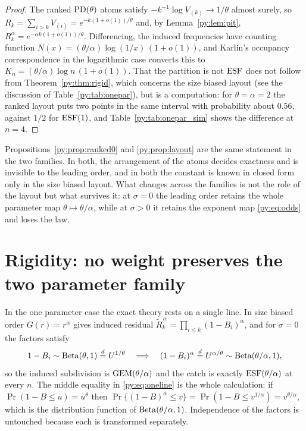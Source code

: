 \begin{proof}
The ranked $\mathrm{PD}(\theta)$ atoms satisfy $-k^{-1}\log V_{(k)} \to 1/\theta$ almost surely, so
$R_k = \sum_{i>k}V_{(i)} = e^{-k(1+o(1))/\theta}$ and, by Lemma~\ref{py:lem:pit},
$R_k^{\alpha} = e^{-\alpha k(1+o(1))/\theta}$. Differencing, the induced frequencies have counting
function $N(x) = (\theta/\alpha)\log(1/x)\,(1+o(1))$, and Karlin's occupancy correspondence in the
logarithmic case converts this to $K_n = (\theta/\alpha)\log n\,(1+o(1))$. That the partition is not
$\mathrm{ESF}$ does not follow from Theorem~\ref{py:thm:rigid}, which concerns the size biased layout (see the
discussion of Table~\ref{py:tab:onepar}), but is a computation: for $\theta = \alpha = 2$ the ranked layout puts
two points in the same interval with probability about $0.56$, against $1/2$ for $\mathrm{ESF}(1)$, and
Table~\ref{py:tab:onepar_sim} shows the difference at $n = 4$.
\end{proof}

\begin{remark}
\label{py:rem:samestatement}
Propositions~\ref{py:prop:ranked0} and \ref{py:prop:layout} are the same statement in the two families. In
both, the arrangement of the atoms decides exactness and is invisible to the leading order, and in
both the constant is known in closed form only in the size biased layout. What changes across the
families is not the role of the layout but what survives it: at $\sigma = 0$ the leading order
retains the whole parameter map $\theta \mapsto \theta/\alpha$, while at $\sigma > 0$ it retains the
exponent map \eqref{py:eq:odds} and loses the law.
\end{remark}

\section{Rigidity: no weight preserves the two parameter family}
\label{py:sec:rigid}

In the one parameter case the exact theory rests on a single line. In size biased order
$G(r) = r^{\alpha}$ gives induced residual
$\widetilde R_k^{\,\alpha} = \prod_{i\le k}(1-B_i)^{\alpha}$, and for $\sigma = 0$ the factors
satisfy
\begin{equation}
1 - B_i \sim \mathrm{Beta}(\theta,1) \overset{d}{=} U^{1/\theta}
\quad\Longrightarrow\quad
(1-B_i)^{\alpha} \overset{d}{=} U^{\alpha/\theta} \sim \mathrm{Beta}(\theta/\alpha, 1),
\label{py:eq:oneline}
\end{equation}
so the induced subdivision is $\mathrm{GEM}(\theta/\alpha)$ and the catch is exactly $\mathrm{ESF}(\theta/\alpha)$
at every $n$. The middle equality in \eqref{py:eq:oneline} is the whole calculation: if
$\Pr(1-B \le u) = u^{\theta}$ then $\Pr\{(1-B)^{\alpha} \le v\} = \Pr(1-B \le v^{1/\alpha}) =
v^{\theta/\alpha}$, which is the distribution function of $\mathrm{Beta}(\theta/\alpha,1)$. Independence
of the factors is untouched because each is transformed separately.

